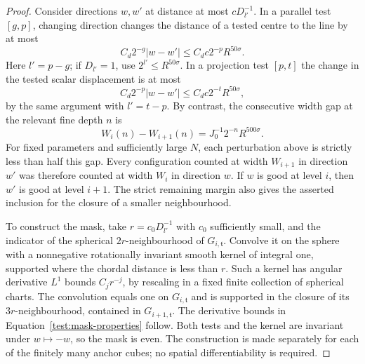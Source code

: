 \begin{proof}
Consider directions $w,w'$ at distance at most $cD_{l'}^{-1}$.
In a parallel test $[g,p]$, changing direction changes the distance
of a tested centre to the line by at most
\[
C_d2^{-g}|w-w'|
 \le C_dc2^{-p}R^{50\sigma}.
\]
Here $l'=p-g$; if $D_{l'}=1$, use
$2^{l'}\le R^{50\sigma}$.  In a projection test $[p,t]$ the change
in the tested scalar displacement is at most
\[
C_d2^{-p}|w-w'|
 \le C_dc2^{-t}R^{50\sigma},
\]
by the same argument with $l'=t-p$.  By contrast, the consecutive
width gap at the relevant fine depth $n$ is
\[
W_i(n)-W_{i+1}(n)=J_0^{-1}2^{-n}R^{500\sigma}.
\]
For fixed parameters and sufficiently large $N$, each perturbation
above is strictly less than half this gap.  Every configuration
counted at width $W_{i+1}$ in direction $w'$ was therefore counted at
width $W_i$ in direction $w$.  If $w$ is good at level $i$, then
$w'$ is good at level $i+1$.  The strict remaining margin also gives
the asserted inclusion for the closure of a smaller neighbourhood.

To construct the mask, take $r=c_0D_{l'}^{-1}$ with $c_0$ sufficiently
small, and the indicator of the spherical $2r$-neighbourhood of
$G_{i,\mathfrak t}$.  Convolve it on the sphere with a nonnegative rotationally
invariant smooth kernel of integral one, supported where the chordal
distance is less than $r$.  Such a kernel has angular derivative
$L^1$ bounds $C_jr^{-j}$, by rescaling in a fixed finite collection of
spherical charts.  The convolution equals one on $G_{i,\mathfrak t}$ and is
supported in the closure of its $3r$-neighbourhood, contained in
$G_{i+1,\mathfrak t}$.  The derivative bounds in
Equation~\eqref{test:mask-properties} follow.  Both tests and the
kernel are invariant under $w\mapsto-w$, so the mask is even.
The construction is made separately for each of the finitely many
anchor cubes; no spatial differentiability is required.
\end{proof}

